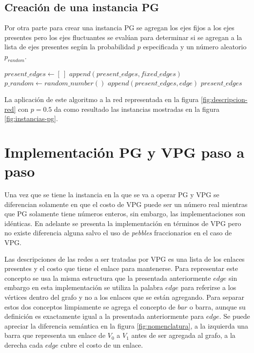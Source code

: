 \subsection{Creación de una instancia PG}
Por otra parte para crear una instancia PG se agregan los ejes fijos a los ejes presentes pero los ejes fluctuantes se evalúan para determinar si se agregan a la lista de ejes presentes según la probabilidad $p$ especificada y un número aleatorio $p_{random}$.

\begin{algorithm}
\begin{algorithmic}[1]
	\State $present\_edges \gets [\:]$
	\State $append(present\_edges, fixed\_edges)$
		\State $p\_random \gets random\_number()$
			\State $append(present\_edges, edge)$
		\EndIf
	\EndFor
	\State
	\Return $present\_edges$
\EndFunction
\end{algorithmic}
\end{algorithm}

La aplicación de este algoritmo a la red representada en la figura \ref{fig:descripcion-red} con $p=0.5$ da como resultado las instancias mostradas en la figura \ref{fig:instancias-pg}.

\section{Implementación PG y VPG paso a paso} \label{vpg-paso-paso}
Una vez que se tiene la instancia en la que se va a operar PG y VPG se diferencian solamente en que el costo de VPG puede ser un número real mientras que PG solamente tiene números enteros, sin embargo, las implementaciones son idénticas. En adelante se presenta la implementación en términos de VPG pero no existe diferencia alguna salvo el uso de \emph{pebbles} fraccionarios en el caso de VPG.

Las descripciones de las redes a ser tratadas por VPG es una lista de los enlaces presentes y el costo que tiene el enlace para mantenerse. Para representar este concepto se usa la misma estructura que la presentada anteriormente $edge$ sin embargo en esta implementación se utiliza la palabra $edge$ para referirse a los vértices dentro del grafo y no a los enlaces que se están agregando. Para separar estos dos conceptos limpiamente se agrega el concepto de $bar$ o barra, aunque su definición es exactamente igual a la presentada anteriormente para $edge$. Se puede apreciar la diferencia semántica en la figura \ref{fig:nomenclatura}, a la izquierda una barra que representa un enlace de $V_0$ a $V_1$ antes de ser agregada al grafo, a la derecha cada $edge$ cubre el costo de un enlace.

